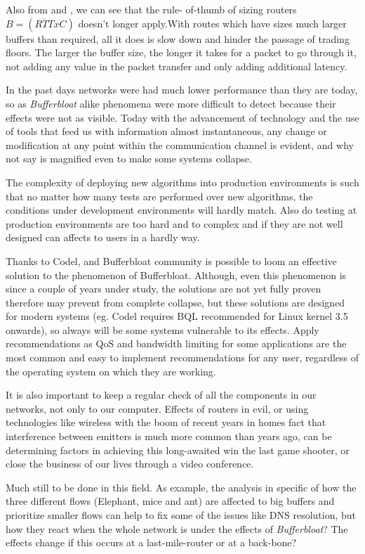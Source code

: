 Also from \cite{main:ref:1} and \cite{Vu-Brugier}, we can see that the rule-
of-thumb of sizing routers $B = (\overline{RTT}xC)$ doesn't longer apply.With
routes which have sizes much larger buffers than required, all it does is slow
down and hinder the passage of trading floors. The larger the buffer size, the
longer it takes for a packet to go through it, not adding any value in the
packet transfer and only adding additional latency.

In the past days networks were had much lower performance than they are today,
so as \emph{Bufferbloat} alike phenomena were more difficult to detect
because their effects were not as visible. Today with the advancement of
technology and the use of tools that feed us with information almost
instantaneous, any change or modification at any point within the
communication channel is evident, and why not say is magnified even to make
some systems collapse.

The complexity of deploying new algorithms into production environments is
such that no matter how many tests are performed over new algorithms, the
conditions under development environments will hardly match. Also do testing
at production environments are too hard and to complex\cite{Vu-Brugier} and if
they are not well designed can affects to users in a hardly way.

Thanks to Codel, and Bufferbloat community is possible to loom an effective
solution to the phenomenon of Bufferbloat. Although, even this phenomenon is
since a couple of years under study, the solutions are not yet fully proven
therefore may prevent from complete collapse, but these solutions are designed
for modern systems (eg. Codel requires BQL recommended for Linux kernel 3.5
onwards), so always will be some systems vulnerable to its effects. Apply
recommendations as QoS and bandwidth limiting for some applications are the
most common and easy to implement recommendations for any user, regardless of
the operating system on which they are working.

It is also important to keep a regular check of all the components in our
networks, not only to our computer. Effects of routers in evil, or using
technologies like wireless with the boom of recent years in homes fact that
interference between emitters is much more common than years ago, can be
determining factors in achieving this long-awaited win the last game shooter,
or close the business of our lives through a video conference.

Much still to be done in this field. As example, the analysis in specific of
how the three different flows (Elephant, mice and
ant)\cite{HaElephants}\cite{evolvshortlongflows} are affected to big buffers
and prioritize smaller flows can help to fix some of the issues like DNS
resolution, but how they react when the whole network is under the effects of
\emph{Bufferbloat}? The effects change if this occurs at a last-mile-router
or at a back-bone?

